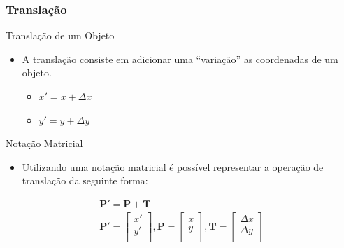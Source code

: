 \documentclass{beamer}
\begin{document}
\begin{frame}
\frametitle{Translação}


	\begin{block}{Translação de um Objeto}
		\begin{itemize}
			\item A translação consiste em adicionar uma ``variação'' as coordenadas de um objeto.
			\begin{itemize}
				\item $x' = x + \Delta x$
				\item $y' = y + \Delta y$
			\end{itemize}
		\end{itemize}
		
	\end{block}
	
	\begin{block}{Notação Matricial}
		\begin{itemize}
			\item Utilizando uma notação matricial é possível representar a operação de translação da seguinte forma:
		\end{itemize}
		\begin{eqnarray*}
			\textbf{P}' = \textbf{P} + \textbf{T} \\
			\textbf{P}' = 	\begin{bmatrix} 
								x' \\
								y' \\
							\end{bmatrix}
			,\textbf{P} = 	\begin{bmatrix}
								x \\
								y \\
							\end{bmatrix}
			,\textbf{T} = 	\begin{bmatrix}
								\Delta x \\
								\Delta y \\
							\end{bmatrix}
		\end{eqnarray*}
		
	\end{block}
	
\end{frame}

\end{document}
